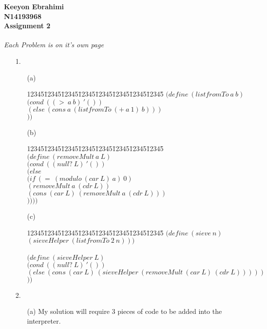 \documentclass[11pt]{article}
\newenvironment{code}{\begin{tabbing}
12345\=12345\=12345\=12345\=12345\=12345\=12345\=12345\= \kill }
{\end{tabbing}}
\begin{document}
\textbf{Keeyon Ebrahimi}\\
\textbf{N14193968}\\
\textbf{Assignment 2}\\
\\ 
\textit{Each Problem is on it's own page } \\
\begin{enumerate}
\item[1. ]

\begin{enumerate}
\item[(a)] 
\begin{code}
$(define\ (listfromTo\ a\ b)$\\
\> $(cond\ ((>\ a\ b)\ '())$\\
\> \> $(else\ (cons\ a\ (listfromTo\ (+\ a\ 1)\ b)))$\\
\> \> $))$ \\
\end{code}

\item[(b)]

\begin{code}
$(define\ (removeMult\ a\ L)$\\
\> $(cond\ ((null?\ L)\ '())$\\
\> \> $(else\ $\\
\> \> \> $(if\ (=\ (modulo\ (car\ L)\ a)\ 0)$\\
\> \> \> \> $(removeMult\ a\ (cdr\ L))$\\
\> \> \> \> $(cons\ (car\ L)\ (removeMult\ a\ (cdr\ L)))$\\
\> \> \> \> $))))$\\
\end{code}

\item[(c)]

\begin{code}
$(define\ (sieve\ n)$ \\
\> $(sieveHelper\ (listfromTo\ 2\ n)))$ \\ \\
$(define\ (sieveHelper\ L)$\\
\> $(cond\ ((null?\ L)\ '())$ \\
\> \> $(else\ (cons\ (car\ L)\ (sieveHelper\ (removeMult\ (car\ L)\ (cdr\ L)))))$\\
\> \> $))$\\
\end{code}
\end{enumerate}
\newpage
\item[2. ] 
\begin{enumerate}
\item[(a)] My solution will require 3 pieces of code to be added into the interpreter.  


\end{enumerate}
\end{enumerate}
\end{document}
